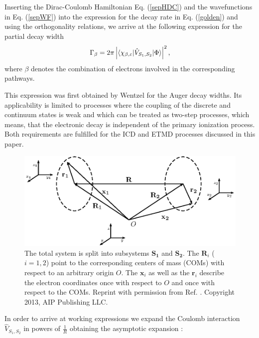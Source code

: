 Inserting the Dirac-Coulomb Hamiltonian Eq. (\ref{sepHDC}) and the wavefunctions
in Eq. (\ref{sepWF}) into the expression for the decay rate in Eq. (\ref{golden})
and using the orthogonality relations, we arrive at the following expression for
the partial decay width
\begin{equation}\label{relgolden}
 \Gamma_\beta=2\pi\left |\braket{\chi_{\beta,\varepsilon}|\hat{V}_{S_1,S_2}|\Phi}\right |^2,
\end{equation}
where $\beta$ denotes the combination of electrons involved in the corresponding pathways.

This expression was first obtained by Wentzel \cite{Wentzel27,Aagren92} for the Auger
decay widths. Its applicability is limited to processes where the coupling of the
discrete and continuum states is weak and which can be treated as two-step processes,
which means, that the electronic decay is independent of the primary ionization process.
Both requirements are fulfilled for the ICD and ETMD processes discussed in this paper.

\begin{figure}[ht]
\centering
\includegraphics[scale=1.0]{pics/taylor_pspic.eps}
%
\caption{The total system is split into subsystems $\mathbf{S_1}$ and
         $\mathbf{S_2}$. The $\mathbf{R}_i$ ($i=1,2$)  point to the
         corresponding  centers of mass (COMs)
         with respect to an arbitrary origin $O$. The $\mathbf{x}_i$
         as well as the $\mathbf{r}_i$ describe the electron coordinates
         once with respect to $O$ and once with respect to the COMs.
         Reprint with permission
         from Ref. \cite{Fasshauer13}. Copyright 2013, AIP Publishing LLC.}
\label{taylor_pspic}
\end{figure}

In order to arrive at working expressions we expand the
Coulomb interaction $\hat{V}_{S_1,S_2}$ in powers of $\frac 1R$ obtaining the
asymptotic expansion \cite{Santra02}:

